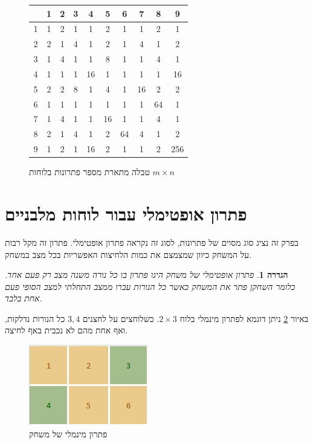 \documentclass[12pt,leqno]{article}
\theoremstyle{theoremdd}
\newtheorem{definition}{הגדרה}[section]
\begin{document}
\begin{figure}
    \caption{טבלה מתארת מספר פתרונות בלוחות 
    $m \times n$
    }
    \centering
    \label{fig:num-sol-in-table}
    \begin{english}
        \begin{tabular}{ |c||c|c|c|c|c|c|c|c|c| }
            \hline
            \ & 1 & 2 & 3 & 4 & 5 & 6 & 7 & 8 & 9 \\
            \hline
            \hline
            1 & 1 & 2 & 1 & 1 & 2 & 1 & 1 & 2 & 1 \\
            \hline
            2 & 2 & 1 & 4 & 1 & 2 & 1 & 4 & 1 & 2 \\
            \hline
            3 & 1 & 4 & 1 & 1 & 8 & 1 & 1 & 4 & 1 \\
            \hline
            4 & 1 & 1 & 1 & 16 & 1 & 1 & 1 & 1 & 16 \\
            \hline
            5 & 2 & 2 & 8 & 1 & 4 & 1 & 16 & 2 & 2 \\
            \hline
            6 & 1 & 1 & 1 & 1 & 1 & 1 & 1 & 64 & 1 \\
            \hline
            7 & 1 & 4 & 1 & 1 & 16 & 1 & 1 & 4 & 1 \\
            \hline
            8 & 2 & 1 & 4 & 1 & 2 & 64 & 4 & 1 & 2 \\
            \hline
            9 & 1 & 2 & 1 & 16 & 2 & 1 & 1 & 2 & 256 \\
            \hline
        \end{tabular}
    \end{english}
\end{figure}

\section{פתרון אופטימלי עבור לוחות מלבניים}
בפרק זה נציג סוג מסוים של פתרונות,
לסוג זה נקראה פתרון אופטימלי.
פתרון זה מקל רבות על המשחק 
כיוון שמצמצם את כמות הלחיצות האפשריות בכל מצב במשחק.
\begin{definition}
    \label{def: opt-sol}
    פתרון אופטימלי של משחק הינו פתרון 
    בו כל נורה משנה מצב רק פעם אחד.
    כלומר 
    השחקן פתר את המשחק כאשר 
    כל הנורות עברו ממצב התחלתי למצב הסופי פעם אחת בלבד.
\end{definition}
באיור 
\ref{fig: min sol 2x3}
ניתן דוגמא לפתרון מינמלי 
בלוח 
$2 \times 3$.
כשלוחצים על לחצנים 
$3, 4$
כל הנורות נדלקות, ואף 
אחת מהם לא נכבית באף לחיצה.

\begin{figure}[ht]
    \caption{פתרון מינמלי של משחק}
    \label{fig: min sol 2x3}
    \centering
    \includegraphics[width=.3\textwidth,keepaspectratio]{images/min_sol_2x3.PNG}
\end{figure}
\end{document}

